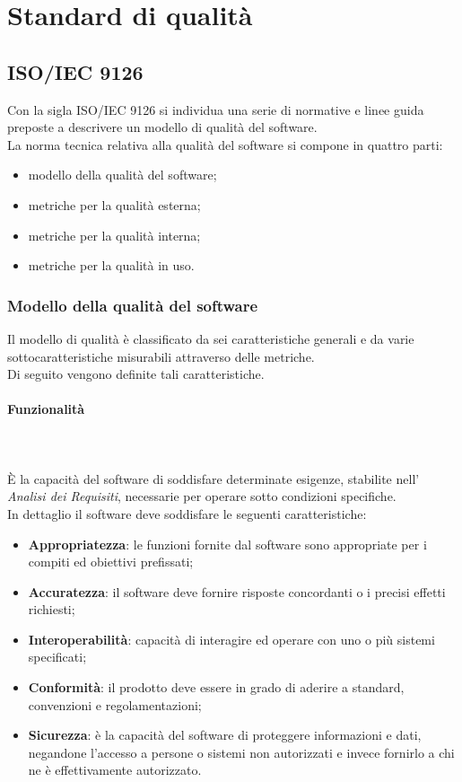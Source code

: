 \section{Standard di qualità} \label{sez:standardQualita}
\label{sez:9126}
\subsection{ISO/IEC 9126}
Con la sigla ISO/IEC 9126 si individua una serie di normative e linee guida preposte a descrivere un modello di qualità del software. \\
La norma tecnica relativa alla qualità del software si compone in quattro parti:
\begin{itemize}
	\item modello della qualità del software;
	\item metriche per la qualità esterna;
	\item metriche per la qualità interna;
	\item metriche per la qualità in uso.
\end{itemize}
\subsubsection{Modello della qualità del software}
Il modello di qualità è classificato da sei caratteristiche generali e da varie sottocaratteristiche misurabili attraverso delle metriche.\\
Di seguito vengono definite tali caratteristiche.

\paragraph{Funzionalità} \mbox{} \\ \mbox{} \\
È la capacità del software di soddisfare determinate esigenze, stabilite nell' \textit{Analisi dei Requisiti}, necessarie per operare sotto condizioni specifiche. \\
In dettaglio il software deve soddisfare le seguenti caratteristiche:
\begin{itemize}
	\item \textbf{Appropriatezza}: le funzioni fornite dal software sono appropriate per i compiti ed obiettivi prefissati;
	\item \textbf{Accuratezza}: il software deve fornire risposte concordanti o i precisi effetti richiesti;
	\item \textbf{Interoperabilità}: capacità di interagire ed operare con uno o più sistemi specificati;
	\item \textbf{Conformità}: il prodotto deve essere in grado di aderire a standard, convenzioni e regolamentazioni;
	\item \textbf{Sicurezza}: è la capacità del software di proteggere informazioni e dati, negandone l'accesso a persone o sistemi non autorizzati e invece fornirlo a chi ne è effettivamente autorizzato.
\end{itemize}
